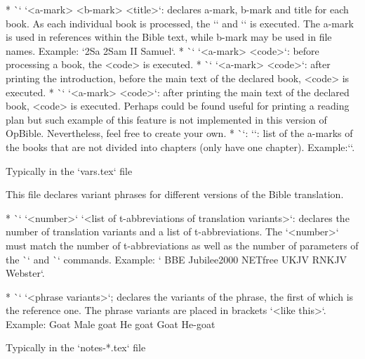 {{\begitems
* \`\BookTitle` `<a-mark> <b-mark> {<title>}`: declares  a-mark, b-mark and title for each book.
  As each individual book is processed, the  `\def\amark{<a-mark>}` and `\def\bmark{b-mark}` is 
  executed. 
  The a-mark is used in references within the Bible text, while  b-mark may be used in file names.
  Example: `\BookTitle 2Sa 2Sam {II Samuel}`.
* \`\BookException` `<a-mark> {<code>}`: before processing a book, the
  <code> is executed.
* \`\BookPre` `<a-mark> {<code>}`: after printing the introduction, before the main text of
  the declared book, <code> is executed.
* \`\BookPost` `<a-mark> {<code>}`: after printing the main text of the declared book, <code> is 
executed.
  Perhaps could be found useful for printing a reading plan but such example of this feature is not 
  implemented in this version of OpBible. 
  Nevertheless, feel free to create your own.
* \`\nochapbooks`: `\def\nochapbooks{<list>}`: list of the a-marks of the books that
  are not divided into chapters (only have one chapter). Example:\nl `\def\nochabooks {Obad Phlm 2John 3John Jude}`.
\enditems

\secc Typically in the `vars.tex` file

This file declares variant phrases for different versions of the Bible translation.

\begitems
* \`\variants` `<number>` `<list of t-abbreviations of translation variants>`: declares the number of
  translation variants and a list of \hbox{t-abbreviations}. The `<number>` must match the number of
  t-abbreviations as well as the number of parameters of the \`\vdef` and \`\ww` commands.
Example:
` {BBE} {Jubilee2000} {NETfree} {UKJV} {RNKJV} {Webster}`. 
  
* \`\vdef` `<phrase variants>`; declares the variants of the phrase, the first of which is
 the reference one. The phrase variants are placed in brackets `{<like this>}`.
 Example: 
 \begtt
       {Goat}      %
       {Male goat} %
       {He goat}   %
       {Goat}      %
       {He-goat}   %
\endtt      
\enditems

\secc Typically in the `notes-*.tex` file

}}
